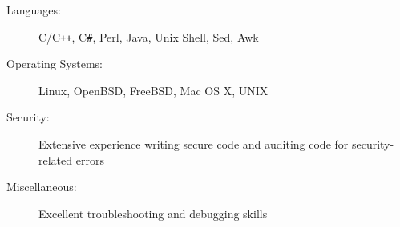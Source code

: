 

\begin{description}
\item[Languages:]
C/C{}\verb!++!, C{}\verb!#!, Perl, Java, Unix Shell, Sed, Awk
\item[Operating Systems:]
Linux, OpenBSD, FreeBSD, Mac OS X, {\sc UNIX}
\item[Security:]
Extensive experience writing secure code and auditing code for security-related errors
\item[Miscellaneous:]
Excellent troubleshooting and debugging skills
\end{description}









	


